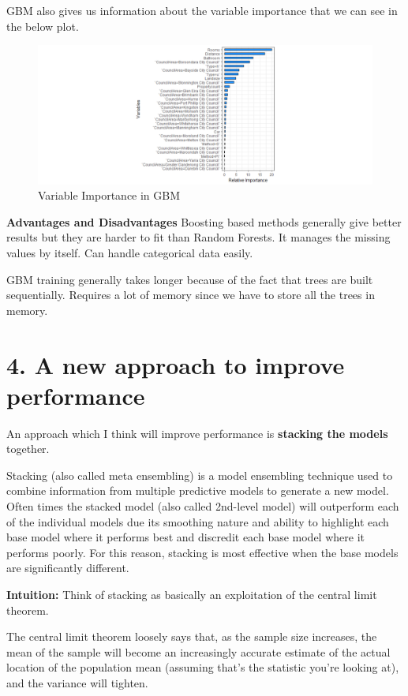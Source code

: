 \documentclass[]{article}
\begin{document}
GBM also gives us information about the variable importance that we can
see in the below plot.

\begin{figure}
\centering
\includegraphics{Report_files/figure-latex/unnamed-chunk-27-1.pdf}
\caption{Variable Importance in GBM}
\end{figure}

\textbf{Advantages and Disadvantages} Boosting based methods generally
give better results but they are harder to fit than Random Forests. It
manages the missing values by itself. Can handle categorical data
easily.

GBM training generally takes longer because of the fact that trees are
built sequentially. Requires a lot of memory since we have to store all
the trees in memory.

\pagebreak

\section{4. A new approach to improve
performance}\label{a-new-approach-to-improve-performance}

An approach which I think will improve performance is \textbf{stacking
the models} together.

Stacking (also called meta ensembling) is a model ensembling technique
used to combine information from multiple predictive models to generate
a new model. Often times the stacked model (also called 2nd-level model)
will outperform each of the individual models due its smoothing nature
and ability to highlight each base model where it performs best and
discredit each base model where it performs poorly. For this reason,
stacking is most effective when the base models are significantly
different.

\textbf{Intuition:} Think of stacking as basically an exploitation of
the central limit theorem.

The central limit theorem loosely says that, as the sample size
increases, the mean of the sample will become an increasingly accurate
estimate of the actual location of the population mean (assuming that's
the statistic you're looking at), and the variance will tighten.
\end{document}
